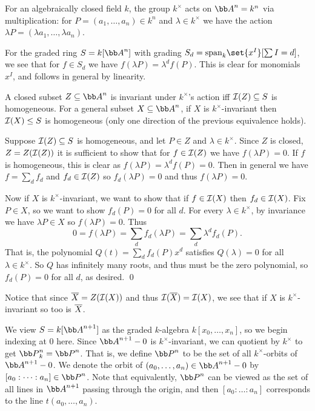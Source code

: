 \eproof

For an algebraically closed field $k$, the group $k^\times$ acts on $\bA^n=k^n$ via multiplication: for $P=(a_1,\dots,a_n)\in k^n$ and $\lambda\in k^\times$ we have the action $\lambda P=(\lambda a_1,\dots,\lambda a_n)$.

For the graded ring $S=k[\bA^n]$ with grading $S_d=\lspan_k\set{x^I}[\sum I=d]$, we see that for $f\in S_d$ we have $f(\lambda P)=\lambda^df(P)$.
This is clear for monomials $x^I$, and follows in general by linearity.

\blemm

    A closed subset $Z\subseteq\bA^n$ is invariant under $k^\times$'s action iff ${{\cal I}}(Z)\subseteq S$ is homogeneous.
    For a general subset $X\subseteq\bA^n$, if $X$ is $k^\times$-invariant then ${{\cal I}}(X)\leq S$ is homogeneous (only one direction of the previous equivalence holds).

\elemm

\bproof

    Suppose ${{\cal I}}(Z)\subseteq S$ is homogeneous, and let $P\in Z$ and $\lambda\in k^\times$.
    Since $Z$ is closed, $Z=Z({{\cal I}}(Z))$ it is sufficient to show that for $f\in{{\cal I}}(Z)$ we have $f(\lambda P)=0$.
    If $f$ is homogeneous, this is clear as $f(\lambda P)=\lambda^df(P)=0$.
    Then in general we have $f=\sum_df_d$ and $f_d\in{{\cal I}}(Z)$ so $f_d(\lambda P)=0$ and thus $f(\lambda P)=0$.

    Now if $X$ is $k^\times$-invariant, we want to show that if $f\in{{\cal I}}(X)$ then $f_d\in{{\cal I}}(X)$.
    Fix $P\in X$, so we want to show $f_d(P)=0$ for all $d$.
    For every $\lambda\in k^\times$, by invariance we have $\lambda P\in X$ so $f(\lambda P)=0$.
    Thus
    $$ 0 = f(\lambda P) = \sum_df_d(\lambda P) = \sum_d\lambda^df_d(P) . $$
    That is, the polynomial $Q(t)=\sum_df_d(P)x^d$ satisfies $Q(\lambda)=0$ for all $\lambda\in k^\times$.
    So $Q$ has infinitely many roots, and thus must be the zero polynomial, so $f_d(P)=0$ for all $d$, as desired.
    \qed

\eproof

Notice that since ${\overline{X}}=Z({{\cal I}}(X))$ and thus ${{\cal I}}({\overline{X}})={{\cal I}}(X)$, we see that if $X$ is $k^\times$-invariant so too is ${\overline{X}}$.

We view $S=k[\bA^{n+1}]$ as the graded $k$-algebra $k[x_0,\dots,x_n]$, so we begin indexing at $0$ here.
Since $\bA^{n+1}-0$ is $k^\times$-invariant, we can quotient by $k^\times$ to get $\bP^n_k=\bP^n$.
That is, we define $\bP^n$ to be the set of all $k^\times$-orbits of $\bA^{n+1}-0$.
We denote the orbit of $(a_0,\dots,a_n)\in\bA^{n+1}-0$ by $[a_0:\dots:a_n]\in\bP^n$.
Note that equivalently, $\bP^n$ can be viewed as the set of all lines in $\bA^{n+1}$ passing through the origin, and then $[a_0:\dots:a_n]$ corresponds to the line $t(a_0,\dots,a_n)$.

